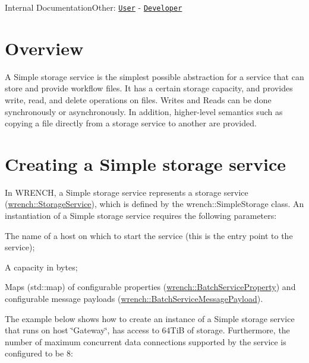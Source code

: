 Internal DocumentationOther\+: \href{../user/wrench-101.html}{\tt User} -\/ \href{../developer/wrench-101.html}{\tt Developer}\hypertarget{guide-simplestorage_guide-simplestorage-overview}{}\section{Overview}\label{guide-simplestorage_guide-simplestorage-overview}
A Simple storage service is the simplest possible abstraction for a service that can store and provide workflow files. It has a certain storage capacity, and provides write, read, and delete operations on files. Writes and Reads can be done synchronously or asynchronously. In addition, higher-\/level semantics such as copying a file directly from a storage service to another are provided.\hypertarget{guide-simplestorage_guide-simplestorage-creating}{}\section{Creating a Simple storage service}\label{guide-simplestorage_guide-simplestorage-creating}
In W\+R\+E\+N\+CH, a Simple storage service represents a storage service ({\ttfamily \hyperlink{classwrench_1_1_storage_service}{wrench\+::\+Storage\+Service}}), which is defined by the {\ttfamily wrench\+::\+Simple\+Storage} class. An instantiation of a Simple storage service requires the following parameters\+:


\begin{DoxyItemize}
\item The name of a host on which to start the service (this is the entry point to the service);
\item A capacity in bytes;
\item Maps ({\ttfamily std\+::map}) of configurable properties ({\ttfamily \hyperlink{classwrench_1_1_batch_service_property}{wrench\+::\+Batch\+Service\+Property}}) and configurable message payloads ({\ttfamily \hyperlink{classwrench_1_1_batch_service_message_payload}{wrench\+::\+Batch\+Service\+Message\+Payload}}).
\end{DoxyItemize}

The example below shows how to create an instance of a Simple storage service that runs on host \char`\"{}\+Gateway\char`\"{}, has access to 64\+TiB of storage. Furthermore, the number of maximum concurrent data connections supported by the service is configured to be 8\+:


